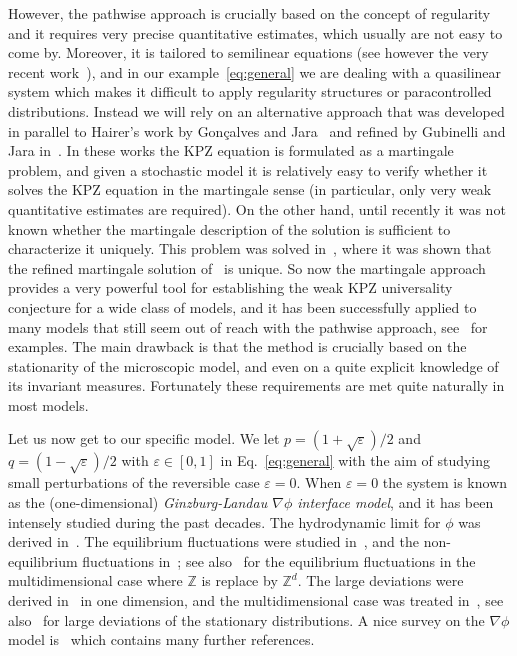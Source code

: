 \documentclass[11pt, a4paper]{article}
\newcommand{\1}{\mathbf{1}}
\newcommand{\Z}{\mathbb{Z}}
\begin{document}
However, the pathwise approach is crucially based on the concept of regularity and it requires very precise quantitative estimates, which usually are not easy to come by. Moreover, it is tailored to semilinear equations (see however the very recent work~\cite{bib:ottoWeber}), and in our example~\eqref{eq:general} we are dealing with a quasilinear system which makes it difficult to apply regularity structures or paracontrolled distributions. Instead we will rely on an alternative approach that was developed in parallel to Hairer's work by Gon\c calves and Jara~\cite{bib:goncalvesJara} and refined by Gubinelli and Jara in~\cite{bib:gubinelliJara}. In these works the KPZ equation is formulated as a martingale problem, and given a stochastic model it is relatively easy to verify whether it solves the KPZ equation in the martingale sense (in particular, only very weak quantitative estimates are required). On the other hand, until recently it was not known whether the martingale description of the solution is sufficient to characterize it uniquely. This problem was solved in~\cite{bib:energyUniqueness}, where it was shown that the refined martingale solution of~\cite{bib:gubinelliJara} is unique. So now the martingale approach provides a very powerful tool for establishing the weak KPZ universality conjecture for a  wide class of models, and it has been successfully applied to many models that still seem out of reach with the pathwise approach, see~\cite{bib:goncalvesJara, bib:goncalvesJaraSethuraman, bib:goncalvesJaraSimon, bib:francoGoncalvesSimon, bib:gubinelliHQ} for examples. The main drawback is that the method is crucially based on the stationarity of the microscopic model, and even on a quite explicit knowledge of its invariant measures. Fortunately these requirements are met quite naturally in most models.

\bigskip

Let us now get to our specific model. We let $p=(1+\sqrt{\varepsilon})/2$ and $q=(1-\sqrt{\varepsilon})/2$ with $\varepsilon\in[0,1]$ in Eq.~\eqref{eq:general} with the aim of studying small perturbations of the reversible case $\varepsilon=0$.
When $\varepsilon=0$ the system is known as the (one-dimensional) \emph{Ginzburg-Landau $\nabla \phi$ interface model}, and it has been intensely studied during the past decades. The hydrodynamic limit for $\phi$ was derived in~\cite{bib:fritz,bib:guoEtAl}. The equilibrium fluctuations were studied in~\cite{bib:spohn, bib:zhu}, and the non-equilibrium fluctuations in~\cite{bib:changYau}; see also~\cite{bib:giacominOllaSpohn} for the equilibrium fluctuations in the multidimensional case where $\Z$ is replace by $\Z^d$. The large deviations were derived in~\cite{bib:donskerVaradhan} in one dimension, and  the multidimensional case was treated in~\cite{bib:funakiNishikawa}, see also~\cite{bib:benArousDeuschel, bib:deuschelEtAl} for large deviations of the stationary distributions. A nice survey on the $\nabla \phi$ model is~\cite{bib:funaki} which contains many further references.
\end{document}
